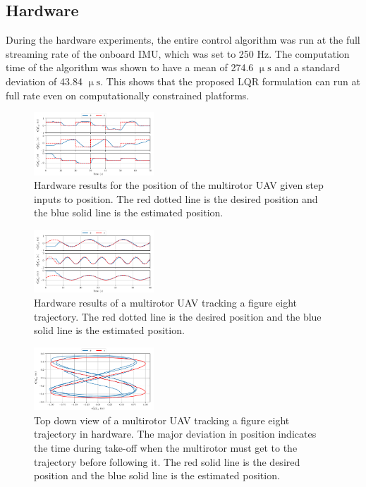 
\subsection{Hardware}

During the hardware experiments, the entire control algorithm was run at the
full streaming rate of the onboard IMU, which was set to 250 Hz. The computation
time of the algorithm was shown to have a mean of 274.6 $\upmu \mathrm{s}$ and a standard
deviation of 43.84 $\upmu \mathrm{s}$. This shows that the proposed LQR
formulation can run at full rate even on computationally constrained platforms.

\begin{figure}
  \centering
  \includegraphics[width=0.4\textwidth]{figures/mocap_wps_position}
  \caption[LQR Hardware Results Flying Waypoints]{Hardware results for the position of the multirotor UAV given step
  inputs to position. The red dotted line is the desired position and the blue
solid line is the estimated position.}
  \label{f:hardware_wps}
\end{figure}

\begin{figure}
  \centering
  \includegraphics[width=0.4\textwidth]{figures/mocap_fig8_position}
  \caption[LQR Hardware Results Flying a Trajectory]{Hardware results of a multirotor UAV tracking a figure eight
  trajectory. The red dotted line is the desired position and the blue solid
line is the estimated position.}
  \label{f:hardware_fig8}
\end{figure}

\begin{figure}
  \centering
  \includegraphics[width=0.4\textwidth]{figures/mocap_fig8_position_2d}
  \caption[Top Down View of LQR Hardware Trajectory Results]{Top down view of a multirotor UAV tracking a figure eight
  trajectory in hardware. The major deviation in position indicates the time
during take-off when the multirotor must get to the trajectory before following
it. The red solid line is the desired position and the blue solid line is the
estimated position.}
  \label{f:hardware_fig8_2d}
\end{figure}

